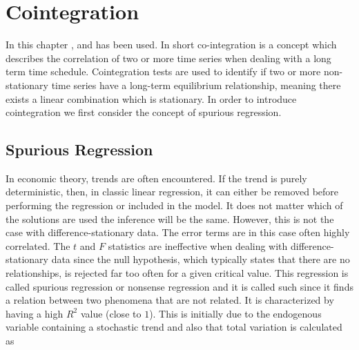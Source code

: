 \chapter{Cointegration}\label{chap:Coint}
In this chapter \cite{Analysis_of_integrated_and_cointegrated_time_series_with_R}, \cite{Cointegration_intro} and \cite{co-Integration_and_error_correction} has been used. 
\pause
In short co-integration is a concept which describes the correlation of two or more time series when dealing with a long term time schedule. Cointegration tests are used to identify if two or more non-stationary time series have a long-term equilibrium relationship, meaning there exists a linear combination which is stationary.
\newline
\noindent In order to introduce cointegration we first consider the concept of spurious regression.



\section{Spurious Regression}
In economic theory, trends are often encountered. If the trend is purely deterministic, then, in classic linear regression, it can either be removed before performing the regression or included in the model. It does not matter which of the solutions are used the inference will be the same. However, this is not the case with difference-stationary data. The error terms are in this case often highly correlated. The $t$ and $F$ statistics are ineffective when dealing with difference-stationary data since the null hypothesis, which typically states that there are no relationships, is rejected far too often for a given critical value. This regression is called spurious regression or nonsense regression and it is called such since it finds a relation between two phenomena that are not related. It is characterized by having a high $R^2$ value (close to $1$). This is initially due to the endogenous variable containing a stochastic trend and also that total variation is calculated as


